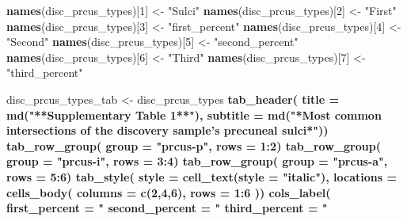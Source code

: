 \documentclass[
]{article}
\newenvironment{Shaded}{\begin{snugshade}}{\end{snugshade}}
\newcommand{\DataTypeTok}[1]{\textcolor[rgb]{0.13,0.29,0.53}{#1}}
\newcommand{\DecValTok}[1]{\textcolor[rgb]{0.00,0.00,0.81}{#1}}
\newcommand{\KeywordTok}[1]{\textcolor[rgb]{0.13,0.29,0.53}{\textbf{#1}}}
\newcommand{\NormalTok}[1]{#1}
\newcommand{\OperatorTok}[1]{\textcolor[rgb]{0.81,0.36,0.00}{\textbf{#1}}}
\newcommand{\StringTok}[1]{\textcolor[rgb]{0.31,0.60,0.02}{#1}}
\begin{document}
\begin{Shaded}
\begin{Highlighting}[]
\KeywordTok{names}\NormalTok{(disc_prcus_types)[}\DecValTok{1}\NormalTok{] <-}\StringTok{ "Sulci"}
\KeywordTok{names}\NormalTok{(disc_prcus_types)[}\DecValTok{2}\NormalTok{] <-}\StringTok{ "First"}
\KeywordTok{names}\NormalTok{(disc_prcus_types)[}\DecValTok{3}\NormalTok{] <-}\StringTok{ "first_percent"}
\KeywordTok{names}\NormalTok{(disc_prcus_types)[}\DecValTok{4}\NormalTok{] <-}\StringTok{ "Second"}
\KeywordTok{names}\NormalTok{(disc_prcus_types)[}\DecValTok{5}\NormalTok{] <-}\StringTok{ "second_percent"}
\KeywordTok{names}\NormalTok{(disc_prcus_types)[}\DecValTok{6}\NormalTok{] <-}\StringTok{ "Third"}
\KeywordTok{names}\NormalTok{(disc_prcus_types)[}\DecValTok{7}\NormalTok{] <-}\StringTok{ "third_percent"}

\NormalTok{disc_prcus_types_tab <-}\StringTok{ }\NormalTok{disc_prcus_types }\OperatorTok{%>%}\StringTok{ }\KeywordTok{gt}\NormalTok{() }\OperatorTok{%>%}
\KeywordTok{tab_header}\NormalTok{(}
  \DataTypeTok{title =} \KeywordTok{md}\NormalTok{(}\StringTok{"**Supplementary Table 1**"}\NormalTok{),}
  \DataTypeTok{subtitle =} \KeywordTok{md}\NormalTok{(}\StringTok{"*Most common intersections of the discovery sample's precuneal sulci*"}\NormalTok{)) }\OperatorTok{%>%}
\KeywordTok{tab_row_group}\NormalTok{(}
    \DataTypeTok{group =} \StringTok{"prcus-p"}\NormalTok{,}
    \DataTypeTok{rows =} \DecValTok{1}\OperatorTok{:}\DecValTok{2}\NormalTok{) }\OperatorTok{%>%}
\KeywordTok{tab_row_group}\NormalTok{(}
    \DataTypeTok{group =} \StringTok{"prcus-i"}\NormalTok{,}
    \DataTypeTok{rows =} \DecValTok{3}\OperatorTok{:}\DecValTok{4}\NormalTok{) }\OperatorTok{%>%}
\KeywordTok{tab_row_group}\NormalTok{(}
    \DataTypeTok{group =} \StringTok{"prcus-a"}\NormalTok{,}
    \DataTypeTok{rows =} \DecValTok{5}\OperatorTok{:}\DecValTok{6}\NormalTok{) }\OperatorTok{%>%}
\KeywordTok{tab_style}\NormalTok{(}
    \DataTypeTok{style =} \KeywordTok{cell_text}\NormalTok{(}\DataTypeTok{style =} \StringTok{"italic"}\NormalTok{),}
    \DataTypeTok{locations =} \KeywordTok{cells_body}\NormalTok{(}
      \DataTypeTok{columns =} \KeywordTok{c}\NormalTok{(}\DecValTok{2}\NormalTok{,}\DecValTok{4}\NormalTok{,}\DecValTok{6}\NormalTok{),}
      \DataTypeTok{rows =} \DecValTok{1}\OperatorTok{:}\DecValTok{6}
\NormalTok{    )) }\OperatorTok{%>%}
\KeywordTok{cols_label}\NormalTok{(}
    \DataTypeTok{first_percent =} \StringTok{"%"}\NormalTok{,}
    \DataTypeTok{second_percent =} \StringTok{"%"}\NormalTok{,}
    \DataTypeTok{third_percent =} \StringTok{"%"}\NormalTok{) }\OperatorTok{%>%}
}}}}}}}}}
\end{Highlighting}
\end{Shaded}
\end{document}

